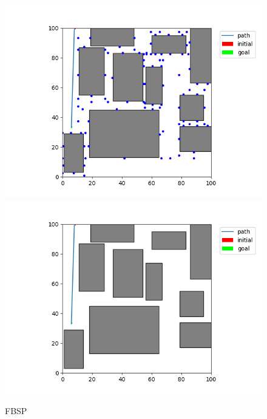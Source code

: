 \documentclass[12pt,a4paper]{article}
\begin{document}
\begin{figure}[H]
\centering
	\includegraphics[scale=.40]{10_50_fbsp_state}
    \includegraphics[scale=.40]{10_50_fbsp_path}
\caption{FBSP}
\end{figure}

\newpage
\end{document}
